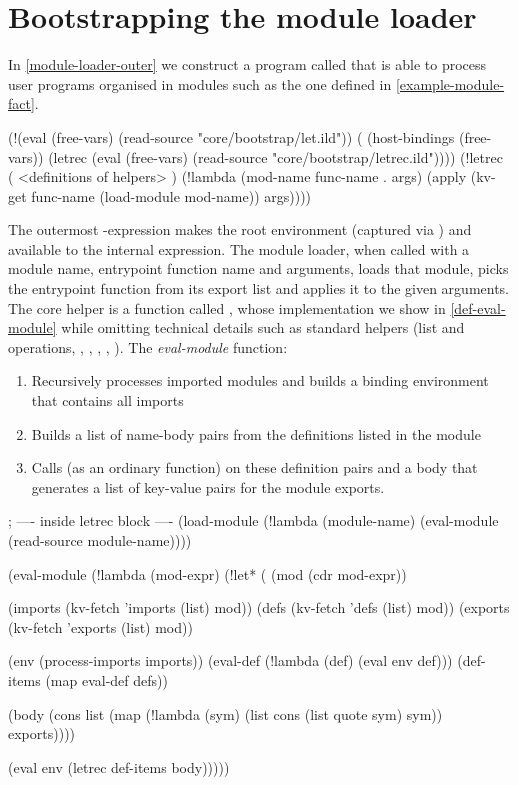 \section{Bootstrapping the module loader}
\label{module-loader}
In \cref{module-loader-outer} we construct a program called
 that is able to process
user programs organised in modules such as the one defined in
\cref{example-module-fact}.
\begin{listingbox}\begin{ildcode}
(!(eval (free-vars) (read-source
    "core/bootstrap/let.ild"))
    ( (host-bindings (free-vars))
      (letrec (eval (free-vars) (read-source
        "core/bootstrap/letrec.ild"))))
  (!letrec
      ( <definitions of helpers> )
    (!lambda (mod-name func-name . args)
      (apply
        (kv-get func-name
          (load-module mod-name))
        args))))
\end{ildcode}\end{listingbox}
\label{module-loader-outer}
The outermost -expression makes the root environment
(captured via ) and  available to the
internal  expression.
The module loader, when called with a module name,
entrypoint function name and arguments, loads that module, picks the entrypoint function
from its export list and applies it to the given arguments.
The core helper is a function called ,
whose implementation we show in \cref{def-eval-module} while
omitting technical details such as standard helpers
(list and  operations, ,
, , , ).
The \emph{eval-module} function:
\begin{enumerate}
\item Recursively processes imported modules and builds a binding environment 
that contains all imports
\item Builds a list of name-body pairs from the definitions listed in the module
\item Calls  (as an ordinary function) on these definition pairs and
a body that generates a list of key-value pairs for the module exports.
\end{enumerate}
\begin{listingbox}\begin{ildcode}
; ---- inside letrec block ----
(load-module (!lambda (module-name)
  (eval-module (read-source module-name))))

(eval-module (!lambda (mod-expr)
  (!let* (
      (mod (cdr mod-expr))

      (imports (kv-fetch 'imports (list) mod))
      (defs    (kv-fetch 'defs    (list) mod))
      (exports (kv-fetch 'exports (list) mod))

      (env (process-imports imports))
      (eval-def (!lambda (def)
        (eval env def)))
      (def-items (map eval-def defs))

      (body (cons list
        (map
          (!lambda (sym)
            (list cons (list quote sym) sym))
          exports))))

    (eval env (letrec def-items body)))))
\end{ildcode}\end{listingbox}
